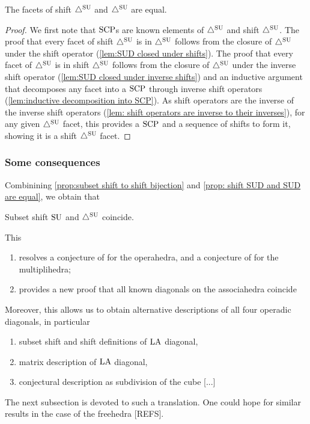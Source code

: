 \begin{proposition} \label{prop: shift SUD and SUD are equal}
    The facets of shift $\triangle^{\mathrm{SU}}$ and $\triangle^{\mathrm{SU}}$ are equal.
\end{proposition}
\begin{proof}
    We first note that $\mathrm{SCP}$s are known elements of $\triangle^{\mathrm{SU}}$ and shift $\triangle^{\mathrm{SU}}$.
    The proof that every facet of shift $\triangle^{\mathrm{SU}}$ is in $\triangle^{\mathrm{SU}}$ follows from the closure of $\triangle^{\mathrm{SU}}$ under the shift operator (\cref{lem:SUD closed under shifts}).
    The proof that every facet of $\triangle^{\mathrm{SU}}$ is in shift $\triangle^{\mathrm{SU}}$ follows from the closure of $\triangle^{\mathrm{SU}}$ under the inverse shift operator (\cref{lem:SUD closed under inverse shifts}) and an inductive argument that decomposes any facet into a $\mathrm{SCP}$ through inverse shift operators (\cref{lem:inductive decomposition into SCP}).
    As shift operators are the inverse of the inverse shift operators (\cref{lem: shift operators are inverse to their inverses}), for any given $\triangle^{\mathrm{SU}}$ facet, this provides a $\mathrm{SCP}$ and a sequence of shifts to form it, showing it is a shift $\triangle^{\mathrm{SU}}$ facet.
\end{proof}


\subsubsection{Some consequences}

Combinining \cref{prop:subset shift to shift bijection} and \cref{prop: shift SUD and SUD are equal}, we obtain that

\begin{theorem}
    Subset shift $\mathrm{SU}$ and $\triangle^{\mathrm{SU}}$ coincide.
\end{theorem}

This
\begin{enumerate}
    \item resolves a conjecture of \cite{LA21} for the operahedra, and a conjecture of \cite{MazuirLA22} for the multiplihedra;
    \item provides a new proof that all known diagonals on the associahedra coincide \cite{saneblidzeComparingDiagonalsAssociahedra2022}
\end{enumerate}
Moreover, this allows us to obtain alternative descriptions of all four operadic diagonals, in particular
\begin{enumerate}
    \item subset shift and shift definitions of $\mathrm{LA}$ diagonal,
    \item matrix description of $\mathrm{LA}$ diagonal,
    \item conjectural description as subdivision of the cube [...]
\end{enumerate}
The next subsection is devoted to such a translation. 
One could hope for similar results in the case of the freehedra [REFS].

